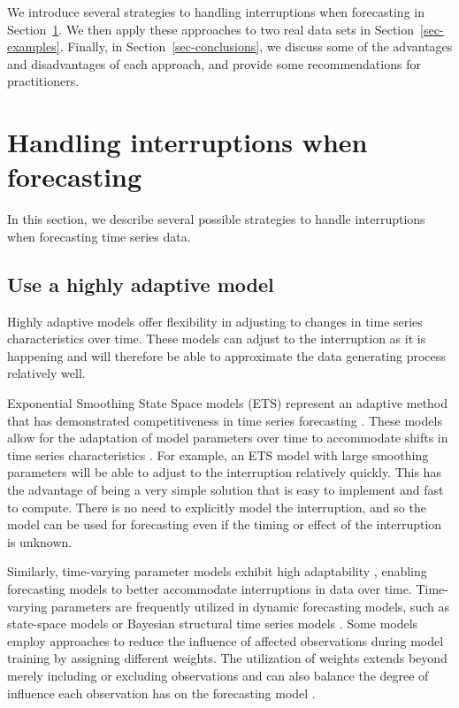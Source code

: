 \documentclass[
  11pt,
  a4paper,
]{article}
\begin{document}
We introduce several strategies to handling interruptions when
forecasting in Section~\ref{sec-methods}. We then apply these approaches
to two real data sets in Section~\ref{sec-examples}. Finally, in
Section~\ref{sec-conclusions}, we discuss some of the advantages and
disadvantages of each approach, and provide some recommendations for
practitioners.

\section{Handling interruptions when forecasting}\label{sec-methods}

In this section, we describe several possible strategies to handle
interruptions when forecasting time series data.

\subsection{Use a highly adaptive
model}\label{use-a-highly-adaptive-model}

Highly adaptive models offer flexibility in adjusting to changes in time
series characteristics over time. These models can adjust to the
interruption as it is happening and will therefore be able to
approximate the data generating process relatively well.

Exponential Smoothing State Space models (ETS) represent an adaptive
method that has demonstrated competitiveness in time series forecasting
\autocite{gardner2006exponential}. These models allow for the adaptation
of model parameters over time to accommodate shifts in time series
characteristics \autocite{hyndman2002state}. For example, an ETS model
with large smoothing parameters will be able to adjust to the
interruption relatively quickly. This has the advantage of being a very
simple solution that is easy to implement and fast to compute. There is
no need to explicitly model the interruption, and so the model can be
used for forecasting even if the timing or effect of the interruption is
unknown.

Similarly, time-varying parameter models exhibit high adaptability
\autocite{harvey2006forecasting}, enabling forecasting models to better
accommodate interruptions in data over time. Time-varying parameters are
frequently utilized in dynamic forecasting models, such as state-space
models or Bayesian structural time series models
\autocite{talih2005structural}. Some models employ approaches to reduce
the influence of affected observations during model training by
assigning different weights. The utilization of weights extends beyond
merely including or excluding observations and can also balance the
degree of influence each observation has on the forecasting model
\autocite{khoshgoftaar2007empirical}.
\end{document}
